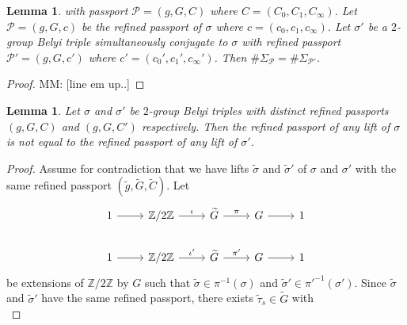 \documentclass{dcthesis}
\newcommand{\ZZ}{\mathbb Z}
\newcommand{\mm}[1]{{\color{blue} \sf MM: [#1]}}
\newcommand{\wt}[1]{\widetilde{#1}}
\numberwithin{equation}{section}
\newtheorem{lemma}[equation]{Lemma}
\theoremstyle{definition}
\theoremstyle{remark}
\begin{document}
{{\begin{lemma}
      with passport
      $\mathcal{P}=(g,G,C)$
      where $C=(C_0,C_1,C_\infty)$.
      Let $\mathscr{P} = (g,G,c)$
      be the refined passport of $\sigma$
      where $c=(c_0,c_1,c_\infty)$.
      Let $\sigma'$ be a $2$-group Belyi triple
      simultaneously conjugate to $\sigma$
      with refined passport $\mathscr{P}'=(g,G,c')$
      where $c' = (c_0',c_1',c_\infty')$.
      Then $\#\Sigma_\mathscr{P} = \#\Sigma_{\mathscr{P}'}$.
    \end{lemma}
    \begin{proof}
      \mm{line em up..}
    \end{proof}
    \begin{lemma}
      \label{lem:identifiedinlift}
      Let $\sigma$ and $\sigma'$
      be $2$-group Belyi triples
      with distinct refined passports
      $(g,G,C)$ and $(g,G,C')$ respectively.
      Then the refined passport of any lift
      of $\sigma$ is not equal to the refined
      passport of any lift of $\sigma'$.
    \end{lemma}
    \begin{proof}
      Assume for contradiction that we have
      lifts
      $\wt{\sigma}$ and $\wt{\sigma}'$
      of $\sigma$ and $\sigma'$
      with the same refined passport
      $(\wt{g},\wt{G},\wt{C})$.
      Let
      \begin{equation}
        \label{eqn:twoextensionsrefinedlemma}
        \begin{tikzcd}
          1\arrow{r}&\ZZ/2\ZZ\arrow{r}{\iota}
                    &\wt{G}\arrow{r}{\pi}
                    &G\arrow{r}&1\\
          1\arrow{r}&\ZZ/2\ZZ\arrow{r}{\iota'}
                    &\wt{G}\arrow{r}{\pi'}
                    &G\arrow{r}&1
        \end{tikzcd}
      \end{equation}
      be extensions of $\ZZ/2\ZZ$ by $G$
      such that $\wt{\sigma}\in\pi^{-1}(\sigma)$
      and $\wt{\sigma}'\in\pi'^{-1}(\sigma')$.
      Since $\wt{\sigma}$ and $\wt{\sigma}'$
      have the same refined passport,
      there exists
      $\wt{\tau}_s\in\wt{G}$
      with
      \begin{equation}

\end{equation}
\end{proof}}}
\end{document}
